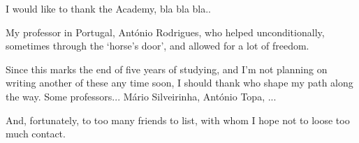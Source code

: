 
\begin{acknowledgments} 

I would like to thank the Academy, bla bla bla..


My professor in Portugal, António Rodrigues, who helped unconditionally, sometimes through the `horse's door', and allowed for a lot of freedom.

Since this marks the end of five years of studying, and I'm not planning on writing another of these any time soon, I should thank who shape my path along the way.
Some professors... Mário Silveirinha, António Topa, ...

And, fortunately, to too many friends to list, with whom I hope not to loose too much contact.






\end{acknowledgments}
\clearpage
\thispagestyle{empty}
\cleardoublepage